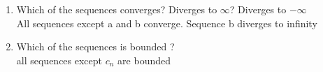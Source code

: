 \documentclass[11pt]{article}
\theoremstyle{definition}  %
\begin{document}
\begin{enumerate}
\begin{enumerate}
    \item Which of the sequences converges? Diverges to $\infty$? Diverges to $-\infty$\\
    All sequences except a and b converge. Sequence b diverges to infinity
    \item Which of the sequences is bounded ?\\
    all sequences except $c_n$ are bounded
  \end{enumerate}
\end{enumerate}
\end{document}
